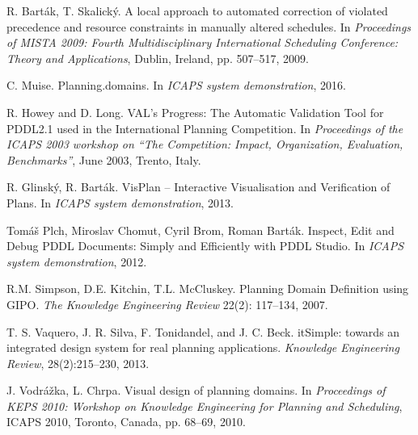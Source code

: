\documentclass[letterpaper]{article}
\begin{document}
\begin{thebibliography}{}

R. Bart\'{a}k, T. Skalick\'{y}. A local approach to automated correction of violated precedence and resource constraints in manually altered schedules. In \emph{Proceedings of MISTA 2009: Fourth Multidisciplinary International Scheduling Conference: Theory and Applications}, Dublin, Ireland, pp. 507--517, 2009.

C. Muise. Planning.domains. In \emph{ICAPS system demonstration}, 2016.

R. Howey and D. Long. VAL's Progress: The Automatic Validation Tool for PDDL2.1 used in the International Planning Competition. In \emph{Proceedings of the ICAPS 2003 workshop on ``The Competition: Impact, Organization, Evaluation, Benchmarks''}, June 2003, Trento, Italy.

R. Glinsk\'{y}, R. Bart\'{a}k. VisPlan -- Interactive Visualisation and Verification of Plans. In \emph{ICAPS system demonstration}, 2013.

Tom\'{a}\v{s} Plch, Miroslav Chomut, Cyril Brom, Roman Bart\'{a}k. Inspect, Edit and Debug PDDL Documents: Simply and Efficiently with PDDL Studio. In \emph{ICAPS system demonstration}, 2012.

R.M. Simpson, D.E. Kitchin, T.L. McCluskey. Planning Domain Definition using GIPO. \emph{The Knowledge Engineering Review} 22(2): 117--134, 2007.

T. S. Vaquero, J. R. Silva, F. Tonidandel, and J. C. Beck. itSimple: towards an integrated design system for real planning applications. \emph{Knowledge Engineering Review}, 28(2):215--230, 2013.

J. Vodr\'{a}\v{z}ka, L. Chrpa. Visual design of planning domains. In \emph{Proceedings of KEPS 2010: Workshop on Knowledge Engineering for Planning and Scheduling}, ICAPS 2010, Toronto, Canada, pp. 68--69, 2010.

\end{thebibliography}


\end{document}
